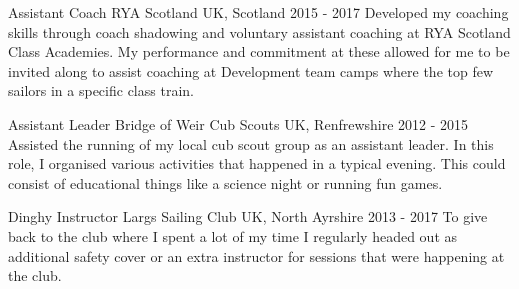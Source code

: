 

\begin{cventries}

  \cventry
    {Assistant Coach} %
    {RYA Scotland} %
    {UK, Scotland} %
    {2015 - 2017} %
    {
      Developed my coaching skills through coach shadowing and voluntary assistant coaching at RYA Scotland Class Academies. My performance and commitment at these allowed for me to be invited along to assist coaching at Development team camps where the top few sailors in a specific class train.
    }
    

  \cventry
    {Assistant Leader} %
    {Bridge of Weir Cub Scouts} %
    {UK, Renfrewshire} %
    {2012 - 2015} %
    {
      Assisted the running of my local cub scout group as an assistant leader. In this role, I organised various activities that happened in a typical evening. This could consist of educational things like a science night or running fun games.
    }

  \cventry
    {Dinghy Instructor} %
    {Largs Sailing Club} %
    {UK, North Ayrshire} %
    {2013 - 2017} %
    {
      To give back to the club where I spent a lot of my time I regularly headed out as additional safety cover or an extra instructor for sessions that were happening at the club.
    }

\end{cventries}
